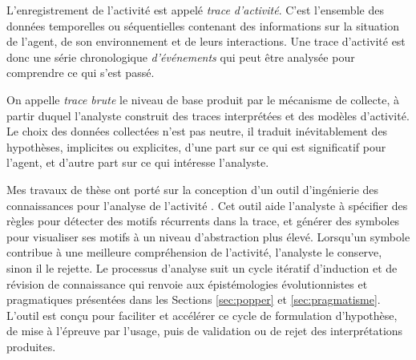 L'enregistrement de l'activité est appelé \emph{trace d'activité}. 
C'est l'ensemble des données temporelles ou séquentielles contenant des informations sur la situation de l'agent, de son environnement et de leurs interactions.
Une trace d'activité est donc une série chronologique \emph{d'événements} qui peut être analysée pour comprendre ce qui s'est passé.%

On appelle \emph{trace brute} le niveau de base produit par le mécanisme de collecte, à partir duquel l'analyste construit des traces interprétées et des modèles d'activité. 
Le choix des données collectées n'est pas neutre, il traduit inévitablement des hypothèses, implicites ou explicites, d'une part sur ce qui est significatif pour l'agent, et d'autre part sur ce qui intéresse l'analyste. 


Mes travaux de thèse ont porté sur la conception d'un outil d'ingénierie des connaissances pour l'analyse de l'activité \cite{georgeon_analyse_2008}. 
Cet outil aide l'analyste à spécifier des règles pour détecter des motifs récurrents dans la trace, et générer des symboles pour visualiser ses motifs à un niveau d'abstraction plus élevé.
Lorsqu'un symbole contribue à une meilleure compréhension de l'activité, l'analyste le conserve, sinon il le rejette.
Le processus d'analyse suit un cycle itératif d'induction et de révision de connaissance qui renvoie aux épistémologies évolutionnistes et pragmatiques présentées dans les Sections \ref{sec:popper} et \ref{sec:pragmatisme}.  
L'outil est conçu pour faciliter et accélérer ce cycle de formulation d'hypothèse, de mise à l'épreuve par l'usage, puis de validation ou de rejet des interprétations produites.

